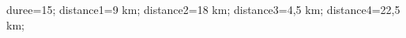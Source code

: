 \documentclass[exercice]{thedocument}%
\begin{document}
%
    \>duree=15;%
    \>distance1=9 km;%
    \>distance2=18 km;%
    \>distance3=4,5 km;%
    \>distance4=22,5 km;%
\end{document}
